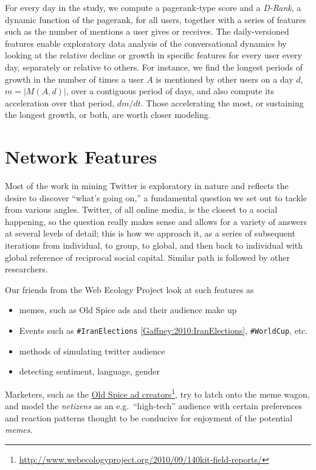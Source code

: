 \documentclass[10pt,oneside]{memoir}
\begin{document}
For every day in the study, we compute a pagerank-type score and a \emph{D-Rank}, a dynamic function of the pagerank, for all users, together with a series of features such as the number of mentions a user gives or receives. The daily-versioned features enable exploratory data analysis of the conversational dynamics by looking at the relative decline or growth in specific features for every user every day, separately or relative to others.  For instance, we find the longest periods of growth in the number of times a user $A$ is mentioned by other users on a day $d$, $m=|M(A,d)|$, over a contiguous period of days, and also compute its acceleration over that period, $dm/dt$. Those accelerating the most, or sustaining the longest growth, or both, are worth closer modeling.


\pagebreak \section{Network Features}
\label{networkfeatures}

Most of the work in mining Twitter is exploratory in nature and reflects the desire to discover ``what's going on,'' a fundamental question we set out to tackle from various angles.  Twitter, of all online media, is the closest to a social happening, so the question really makes sense and allows for a variety of answers at several levels of detail; this is how we approach it, as a series of subsequent iterations from individual, to group, to global, and then back to individual with global reference of reciprocal social capital.  Similar path is followed by other researchers.


Our friends from the Web Ecology Project look at such features as


\begin{itemize}


\item memes, such as Old Spice ads and their audience make up

\item Events such as \texttt{\#IranElections} \ref{Gaffney:2010:IranElections}, \texttt{\#WorldCup}, etc.

\item methods of simulating twitter audience

\item detecting sentiment, language, gender
\end{itemize}

Marketers, such as the \href{http://www.webecologyproject.org/2010/09/140kit-field-reports/}{Old Spice ad creators}\footnote{\href{http://www.webecologyproject.org/2010/09/140kit-field-reports/}{http://www.webecologyproject.org/2010/09/140kit-field-reports/}}, try to latch onto the meme wagon, and model the {\itshape netizens} as an e.g.\ ``high-tech'' audience with certain preferences and reaction patterns thought to be conducive for enjoyment of the potential {\itshape memes}.
\end{document}
